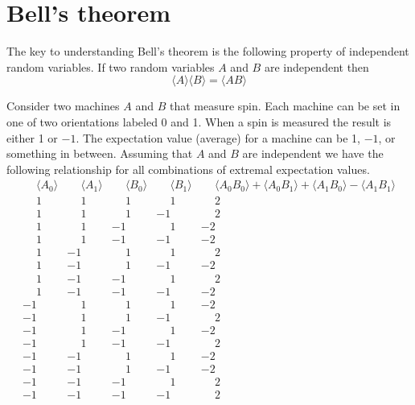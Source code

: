 

\section*{Bell's theorem}

The key to understanding Bell's theorem
is the following property of independent random variables.
If two random variables $A$ and $B$ are independent then
\begin{equation*}
\langle A\rangle\langle B\rangle=\langle AB\rangle
\end{equation*}

Consider two machines $A$ and $B$ that measure spin.
Each machine can be set in one of two orientations labeled 0 and 1.
When a spin is measured the result is either 1 or $-1$.
The expectation value (average) for a machine can be 1, $-1$, or something in between.
Assuming that $A$ and $B$ are independent we have the following relationship
for all combinations of extremal expectation values.
\begin{equation*}
\begin{matrix}
\phantom{-}\langle A_0\rangle & \phantom{-}\langle A_1\rangle
& \phantom{-}\langle B_0\rangle & \phantom{-}\langle B_1\rangle
& \phantom{-}\langle A_0B_0\rangle+\langle A_0B_1\rangle+\langle A_1B_0\rangle-\langle A_1B_1\rangle
\\
\phantom{-}1 & \phantom{-}1 & \phantom{-}1 & \phantom{-}1 & \phantom{-}2
\\
\phantom{-}1 & \phantom{-}1 & \phantom{-}1 &           -1 & \phantom{-}2
\\
\phantom{-}1 & \phantom{-}1 &           -1 & \phantom{-}1 &           -2
\\
\phantom{-}1 & \phantom{-}1 &           -1 &           -1 &           -2
\\
\phantom{-}1 &          -1 & \phantom{-}1 & \phantom{-}1 & \phantom{-}2
\\
\phantom{-}1 &          -1 & \phantom{-}1 &           -1 &           -2
\\
\phantom{-}1 &          -1 &           -1 & \phantom{-}1 & \phantom{-}2
\\
\phantom{-}1 &          -1 &           -1 &           -1 &           -2
\\
          -1 & \phantom{-}1 & \phantom{-}1 & \phantom{-}1 &           -2
\\
          -1 & \phantom{-}1 & \phantom{-}1 &           -1 & \phantom{-}2
\\
          -1 & \phantom{-}1 &           -1 & \phantom{-}1 &           -2
\\
          -1 & \phantom{-}1 &           -1 &           -1 & \phantom{-}2
\\
          -1 &           -1 & \phantom{-}1 & \phantom{-}1 &           -2
\\
          -1 &           -1 & \phantom{-}1 &           -1 &           -2
\\
          -1 &           -1 &           -1 & \phantom{-}1 & \phantom{-}2
\\
          -1 &           -1 &           -1 &           -1 & \phantom{-}2
\end{matrix}
\end{equation*}

